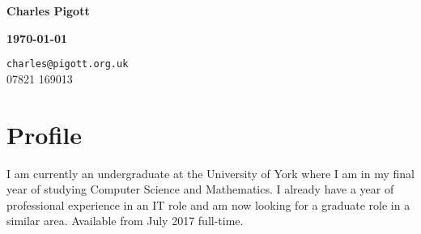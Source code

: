 \documentclass[11pt,a4paper]{article}
\makeatletter
\def\myemail{charles@pigott.org.uk}
\def\myphone{07821 169013}
\makeatother
\begin{document}

\noindent\begin{minipage}{0.4\textwidth}
\textbf{\Huge{Charles Pigott}}
\end{minipage}
\hfill
\begin{minipage}{0.4\textwidth}
\begin{flushright}
  \textbf{\mydate\today}\par
\end{flushright}
\end{minipage}

\begin{flushright}
  \texttt{\myemail}\\
  \myphone
\end{flushright}
\par

\section{Profile}
I am currently an undergraduate at the University of York where I am in my final
year of studying Computer Science and Mathematics. I already have a year of
professional experience in an IT role and am now looking for a graduate role in
a similar area. Available from July 2017 full-time.
\end{document}
